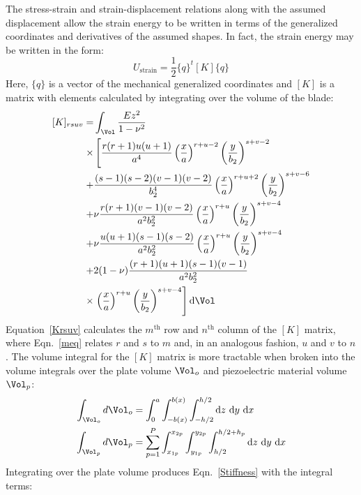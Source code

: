 \documentclass{article}
\begin{document}
\begin{body}
\begin{appendices}
{The stress-strain and strain-displacement relations along with the assumed displacement allow the strain energy to be written in terms of the generalized coordinates and derivatives of the assumed shapes. In fact, the strain energy may be written in the form:
\begin{equation}
U_{\text{strain}}=\frac{1}{2}\{q\}^t [K] \{q\}
\end{equation}
Here, $\{q\}$ is a vector of the mechanical generalized coordinates and $[K]$ is a matrix with elements calculated by integrating over the volume of the blade:
\begin{equation}\label{Krsuv}
\begin{split}
[K]_{rsuv}=&\int_{\Vol} \frac{Ez^2}{1-\nu^2} \\
\times &\left[\frac{r(r+1)u(u+1)}{a^4}\left(\frac{x}{a}\right)^{r+u-2}\left(\frac{y}{b_2}\right)^{s+v-2}\right. \\
+&\frac{(s-1)(s-2)(v-1)(v-2)}{b_2^4}\left(\frac{x}{a}\right)^{r+u+2}\left(\frac{y}{b_2}\right)^{s+v-6} \\
+&\nu \frac{r(r+1)(v-1)(v-2)}{a^2 b_2^2} \left(\frac{x}{a}\right)^{r+u}\left(\frac{y}{b_2}\right)^{s+v-4} \\
+&\nu \frac{u(u+1)(s-1)(s-2)}{a^2 b_2^2} \left(\frac{x}{a}\right)^{r+u}\left(\frac{y}{b_2}\right)^{s+v-4} \\
+&2(1-\nu) \frac{(r+1)(u+1)(s-1)(v-1)}{a^2 b_2^2} \\
\times &\left. \left(\frac{x}{a}\right)^{r+u}\left(\frac{y}{b_2}\right)^{s+v-4} \right] \text{d}\Vol
\end{split}
\end{equation}
Equation~\eqref{Krsuv} calculates the $m^{\text{th}}$ row and $n^{\text{th}}$ column of the $[K]$ matrix, where Eqn.~\eqref{meq} relates $r$ and $s$ to $m$ and, in an analogous fashion, $u$ and $v$ to $n$. The volume integral for the $[K]$ matrix is more tractable when broken into the volume integrals over the plate volume $\Vol_o$ and piezoelectric material volume $\Vol_p$:
\begin{align}
\int_{\Vol_o} d\Vol_o &=\int_0^a \int_{-b(x)}^{b(x)} \int_{-h/2}^{h/2} \text{d}z\ \text{d}y \ \text{d}x \\
\int_{\Vol_p} d\Vol_p &=\sum_{p=1}^P \int_{x_{1p}}^{x_{2p}} \int_{y_{1p}}^{y_{2p}} \int_{h/2}^{h/2+h_p} \text{d}z\ \text{d}y \ \text{d}x
\end{align}
Integrating over the plate volume produces Eqn.~\eqref{Stiffness} with the integral terms:
\begin{align}\label{Stiffness2}

\end{align}}
\end{appendices}
\end{body}
\end{document}
